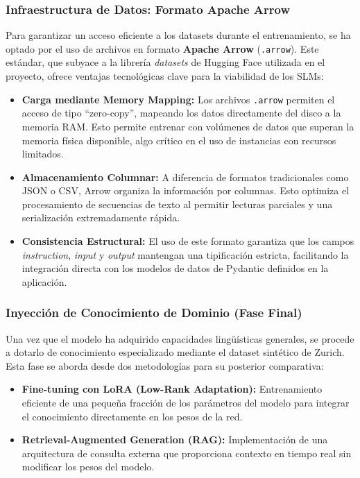\subsubsection{Infraestructura de Datos: Formato Apache Arrow}
Para garantizar un acceso eficiente a los datasets durante el entrenamiento, se ha optado por el uso de archivos en formato \textbf{Apache Arrow} (\texttt{.arrow}). Este estándar, que subyace a la librería \textit{datasets} de Hugging Face utilizada en el proyecto, ofrece ventajas tecnológicas clave para la viabilidad de los SLMs:

\begin{itemize}
    \item \textbf{Carga mediante Memory Mapping:} Los archivos \texttt{.arrow} permiten el acceso de tipo ``zero-copy'', mapeando los datos directamente del disco a la memoria RAM. Esto permite entrenar con volúmenes de datos que superan la memoria física disponible, algo crítico en el uso de instancias con recursos limitados.
    \item \textbf{Almacenamiento Columnar:} A diferencia de formatos tradicionales como JSON o CSV, Arrow organiza la información por columnas. Esto optimiza el procesamiento de secuencias de texto al permitir lecturas parciales y una serialización extremadamente rápida.
    \item \textbf{Consistencia Estructural:} El uso de este formato garantiza que los campos \textit{instruction}, \textit{input} y \textit{output} mantengan una tipificación estricta, facilitando la integración directa con los modelos de datos de Pydantic definidos en la aplicación.
\end{itemize}

\subsubsection{Inyección de Conocimiento de Dominio (Fase Final)}
Una vez que el modelo ha adquirido capacidades lingüísticas generales, se procede a dotarlo de conocimiento especializado mediante el dataset sintético de Zurich. Esta fase se aborda desde dos metodologías para su posterior comparativa:
\begin{itemize}
    \item \textbf{Fine-tuning con LoRA (Low-Rank Adaptation):} Entrenamiento eficiente de una pequeña fracción de los parámetros del modelo para integrar el conocimiento directamente en los pesos de la red.
    \item \textbf{Retrieval-Augmented Generation (RAG):} Implementación de una arquitectura de consulta externa que proporciona contexto en tiempo real sin modificar los pesos del modelo.
\end{itemize}

